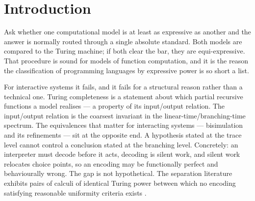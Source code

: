\documentclass[11pt,a4paper]{article}
\theoremstyle{definition}
\theoremstyle{plain}
\theoremstyle{remark}
\begin{document}
\begin{abstract}
Two conditions are then isolated: \emph{hosting} (faithfulness), which says the
target can run the source, and \emph{exhausting} (density), which says the target is
nothing the source cannot assemble. They induce a preorder whose degrees refine
Turing completeness, the classical notion being recovered as the trace collapse ---
which above the Turing threshold has exactly one degree where the branching-time
order has many. Our main structural observation is that the two conditions are the
two halves of mutual meta-circularity: hosting yields an interpreter for the source
written in the target, exhausting an interpreter for the target written in the
source, and their two composites are meta-circular interpreters, each behaviourally
the identity and syntactically not.
\end{abstract}

\tableofcontents

\section{Introduction}
\label{sec:intro}

Ask whether one computational model is at least as expressive as another and the
answer is normally routed through a single absolute standard. Both models are
compared to the Turing machine; if both clear the bar, they are equi-expressive.
That procedure is sound for models of function computation, and it is the reason the
classification of programming languages by expressive power is so short a list.

For interactive systems it fails, and it fails for a structural reason rather than a
technical one. Turing completeness is a statement about which partial recursive
functions a model realises --- a property of its input/output relation. The
input/output relation is the coarsest invariant in the linear-time/branching-time
spectrum. The equivalences that matter for interacting systems --- bisimulation and its
refinements --- sit at the opposite end. A hypothesis stated at the trace level cannot
control a conclusion stated at the branching level. Concretely: an interpreter must
decode before it acts, decoding is silent work, and silent work relocates choice
points, so an encoding may be functionally perfect and behaviourally wrong. The gap
is not hypothetical. The separation literature exhibits pairs of calculi of identical
Turing power between which no encoding satisfying reasonable uniformity criteria
exists \cite{palamidessi,gorla,peters-glabbeek}.
\end{document}
